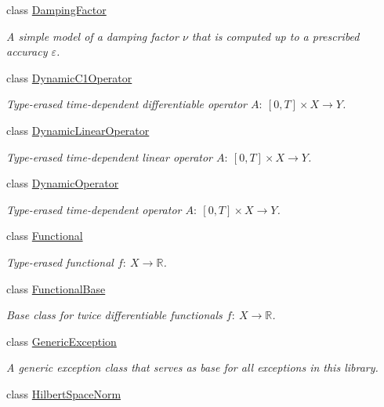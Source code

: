 \begin{DoxyCompactItemize}
class \hyperlink{classSpacy_1_1DampingFactor}{Damping\+Factor}
\begin{DoxyCompactList}\small\item\em A simple model of a damping factor $\nu$ that is computed up to a prescribed accuracy $\varepsilon$. \end{DoxyCompactList}\item 
class \hyperlink{classSpacy_1_1DynamicC1Operator}{Dynamic\+C1\+Operator}
\begin{DoxyCompactList}\small\item\em Type-\/erased time-\/dependent differentiable operator $A:\ [0,T] \times X \to Y $. \end{DoxyCompactList}\item 
class \hyperlink{classSpacy_1_1DynamicLinearOperator}{Dynamic\+Linear\+Operator}
\begin{DoxyCompactList}\small\item\em Type-\/erased time-\/dependent linear operator $A:\ [0,T] \times X \to Y $. \end{DoxyCompactList}\item 
class \hyperlink{classSpacy_1_1DynamicOperator}{Dynamic\+Operator}
\begin{DoxyCompactList}\small\item\em Type-\/erased time-\/dependent operator $A:\ [0,T] \times X \to Y $. \end{DoxyCompactList}\item 
class \hyperlink{classSpacy_1_1Functional}{Functional}
\begin{DoxyCompactList}\small\item\em Type-\/erased functional $f:\ X \to \mathbb{R} $. \end{DoxyCompactList}\item 
class \hyperlink{classSpacy_1_1FunctionalBase}{Functional\+Base}
\begin{DoxyCompactList}\small\item\em Base class for twice differentiable functionals $ f:\ X\rightarrow \mathbb{R}$. \end{DoxyCompactList}\item 
class \hyperlink{classSpacy_1_1GenericException}{Generic\+Exception}
\begin{DoxyCompactList}\small\item\em A generic exception class that serves as base for all exceptions in this library. \end{DoxyCompactList}\item 
class \hyperlink{classSpacy_1_1HilbertSpaceNorm}{Hilbert\+Space\+Norm}

\end{DoxyCompactItemize}
